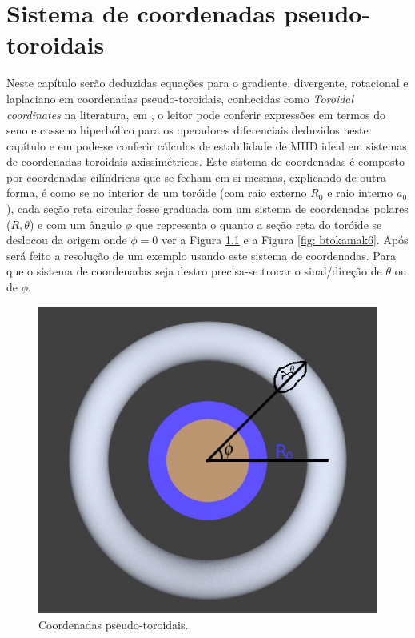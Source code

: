\documentclass[12pt,oneside,a4paper]{abntex2}
\begin{document}
\chapter{Sistema de coordenadas pseudo-toroidais}
\label{pseudo-toroidaiss}
\noindent Neste capítulo serão deduzidas equações para o gradiente, divergente, rotacional e laplaciano em coordenadas pseudo-toroidais, conhecidas como \textit{Toroidal coordinates} na literatura, em \cite{weisstein2003toroidal}, o leitor pode conferir expressões em termos do seno e cosseno hiperbólico para os operadores diferenciais deduzidos neste capítulo e em \cite{grimm1983ideal} pode-se conferir cálculos de estabilidade de MHD ideal em sistemas de coordenadas toroidais axissimétricos. Este sistema de coordenadas é composto por coordenadas cilíndricas que se fecham em si mesmas, explicando de outra forma, é como se no interior de um toróide (com raio externo $R_0$ e raio interno $a_0$), cada seção reta circular fosse graduada com um sistema de coordenadas polares ($R,\theta$) e com um ângulo $\phi$ que representa o quanto a seção reta do toróide se deslocou da origem onde $\phi=0$ ver a Figura \ref{fig: btokamak5} e a Figura \ref{fig: btokamak6}. Após será feito a resolução de um exemplo usando este sistema de coordenadas.  
Para que o sistema de coordenadas seja destro precisa-se trocar o sinal/direção de $\theta$ ou de $\phi$. 
\begin{figure}[H]
\centering
\includegraphics[scale=0.7]{pseudotoridal1.png}
\caption{Coordenadas pseudo-toroidais.}
\label{fig: btokamak5}
\end{figure}
\end{document}

